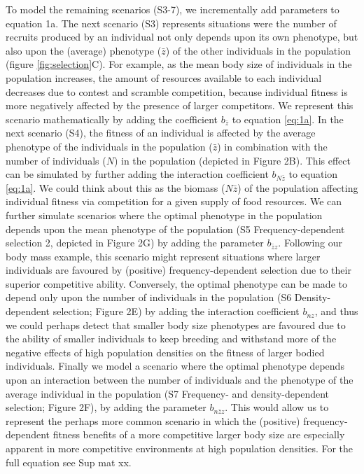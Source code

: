 \documentclass{article}
\begin{document}
To model the remaining scenarios (S3-7), we incrementally add parameters to equation 1a. The next scenario (S3) represents situations were the number of recruits produced by an individual not only depends upon its own phenotype, but also upon the (average) phenotype ($\bar{z}$) of the other individuals in the population (figure \ref{fig:selection}C). For example, as the mean body size of individuals in the population increases, the amount of resources available to each individual decreases due to contest and scramble competition, because individual fitness is more negatively affected by the presence of larger competitors. We represent this scenario mathematically by adding the coefficient $b_{\bar{z}}$ to equation \ref{eq:1a}. In the next scenario (S4), the fitness of an individual is affected by the average phenotype of the individuals in the population ($\bar{z}$) in combination with the number of individuals ($N$) in the population (depicted in Figure 2B). This effect can be simulated by further adding the interaction coefficient $b_{N\bar{z}}$ to equation \ref{eq:1a}. We could think about this as the biomass (${N\bar{z}}$) of the population affecting individual fitness via competition for a given supply of food resources. We can further simulate scenarios where the optimal phenotype in the population depends upon the mean phenotype of the population (S5 Frequency-dependent selection 2, depicted in Figure 2G) by adding the parameter $b_{\bar{z}z}$. Following our body mass example, this scenario might represent situations where larger individuals are favoured by (positive) frequency-dependent selection due to their superior competitive ability. Conversely, the optimal phenotype can be made to depend only upon the number of individuals in the population (S6 Density-dependent selection; Figure 2E) by adding the interaction coefficient $b_{nz}$, and thus we could perhaps detect that smaller body size phenotypes are favoured due to the ability of smaller individuals to keep breeding and withstand more of the negative effects of high population densities on the fitness of larger bodied individuals. Finally we model a scenario where the optimal phenotype depends upon an interaction between the number of individuals and the phenotype of the average individual in the population (S7 Frequency- and density-dependent selection; Figure 2F), by adding the parameter $b_{n\bar{z}z}$. This would allow us to represent the perhaps more common scenario in which the (positive) frequency-dependent fitness benefits of a more competitive larger body size are especially apparent in more competitive environments at high population densities. For the full equation see Sup mat xx.
\end{document}
